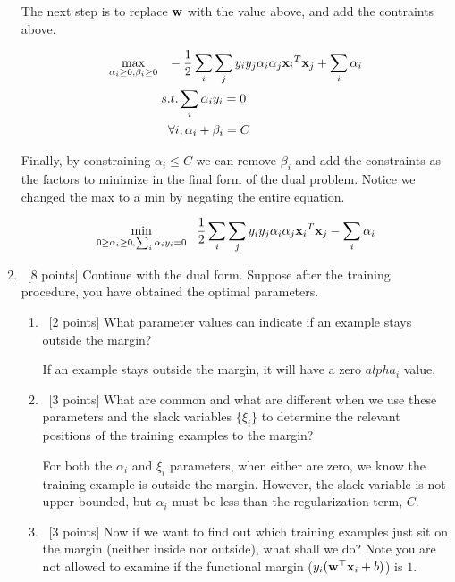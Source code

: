\documentclass[12pt, fullpage,letterpaper]{article}
\begin{document}
\begin{enumerate}
		The next step is to replace ${\bf w}$ with the value above, and add the contraints above. 
		
		
		\begin{align*}
		\max\limits_{\alpha_i \ge 0, \beta_i \ge 0} &\;\;\; - \frac{1}{2} \sum_i \sum_j y_i y_j \alpha_i \alpha_j {{\bf x}_i}^T {\bf x}_j + \sum_i \alpha_i \\		
		&\; s.t. \sum_i \alpha_i y_i = 0 \\
		&\;\;\; \forall i, \alpha_i + \beta_i = C 
		\end{align*}
		
		Finally, by constraining $\alpha_i \le C$ we can remove $\beta_i$ and add the constraints as the factors to minimize in the final form of the dual problem. Notice we changed the max to a min by negating the entire equation. 
		
		
	 	\begin{align*}
		\min\limits_{0 \ge \alpha_i \ge 0, \sum_i \alpha_i y_i = 0} &\;\;\;  \frac{1}{2} \sum_i \sum_j y_i y_j \alpha_i \alpha_j {{\bf x}_i}^T {\bf x}_j - \sum_i \alpha_i \\	
		\end{align*}
	
	
	\item~[8 points] Continue with the dual form. Suppose after the training procedure, you have obtained the optimal parameters.
	\begin{enumerate}
		\item~[2 points] What parameter values can indicate if an example stays outside the margin?

		If an example stays outside the margin, it will have a zero $alpha_i$ value.		
		
		\item~[3 points] What are common and what are different when we use these parameters and the slack variables $\{\xi_i\}$ to determine the relevant positions of the training examples to the margin?

		For both the $\alpha_i$ and $\xi_i$ parameters, when either are zero, we know the training example is outside the margin. However, the slack variable is not upper bounded, but $\alpha_i$ must be less than the regularization term, $C$.		
		
		\item~[3 points] Now if we want to find out which training examples just sit on the margin (neither inside nor outside), what shall we do? Note you are not allowed to examine if the functional margin (\ie $y_i({\bf w}^\top{\bf x}_i +b)$) is $1$.
	\end{enumerate}
	

\end{enumerate}
\end{document}
